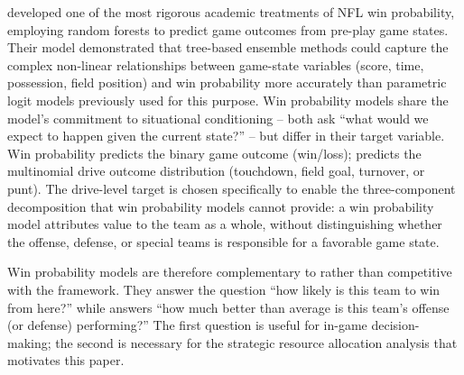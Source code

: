 \textcite{lock2014randomforests} developed one of the most rigorous academic treatments of NFL win probability, employing random forests to predict game outcomes from pre-play game states. Their model demonstrated that tree-based ensemble methods could capture the complex non-linear relationships between game-state variables (score, time, possession, field position) and win probability more accurately than parametric logit models previously used for this purpose. Win probability models share the \xscore{} model's commitment to situational conditioning  -- both ask ``what would we expect to happen given the current state?''  -- but differ in their target variable. Win probability predicts the binary game outcome (win/loss); \xscore{} predicts the multinomial drive outcome distribution (touchdown, field goal, turnover, or punt). The drive-level target is chosen specifically to enable the three-component decomposition that win probability models cannot provide: a win probability model attributes value to the team as a whole, without distinguishing whether the offense, defense, or special teams is responsible for a favorable game state.

Win probability models are therefore complementary to rather than competitive with the \gds{} framework. They answer the question ``how likely is this team to win from here?'' while \gds{} answers ``how much better than average is this team's offense (or defense) performing?'' The first question is useful for in-game decision-making; the second is necessary for the strategic resource allocation analysis that motivates this paper.
